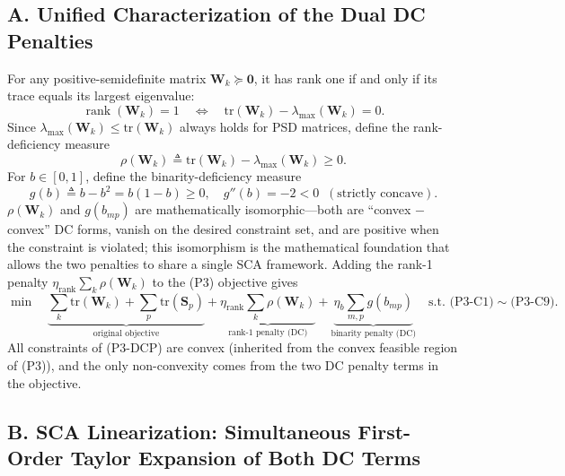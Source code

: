 \documentclass[12pt,a4paper]{article}
\newcommand{\mat}[1]{\mathbf{#1}}
\newcommand{\tr}{\text{tr}}
\DeclareMathOperator{\rank}{rank}
\begin{document}
\subsection*{A. Unified Characterization of the Dual DC Penalties}

For any positive-semidefinite matrix $\mat{W}_k \succeq \mat{0}$, it has rank one if and only if its trace equals its largest eigenvalue:
\begin{equation}\label{eq:rank1-equivalence}
\rank(\mat{W}_k) = 1 \quad \Longleftrightarrow \quad \tr(\mat{W}_k) - \lambda_{\max}(\mat{W}_k) = 0.
\end{equation}
Since $\lambda_{\max}(\mat{W}_k) \leq \tr(\mat{W}_k)$ always holds for PSD matrices, define the rank-deficiency measure
\begin{equation}\label{eq:rho-def}
\rho(\mat{W}_k) \triangleq \tr(\mat{W}_k) - \lambda_{\max}(\mat{W}_k) \geq 0.
\end{equation}
For $b \in [0,1]$, define the binarity-deficiency measure
\begin{equation}\label{eq:g-def}
g(b) \triangleq b - b^2 = b(1-b) \geq 0, \quad g''(b) = -2 < 0 \;\; (\text{strictly concave}).
\end{equation}
$\rho(\mat{W}_k)$ and $g(b_{mp})$ are mathematically isomorphic---both are ``convex $-$ convex'' DC forms, vanish on the desired constraint set, and are positive when the constraint is violated; this isomorphism is the mathematical foundation that allows the two penalties to share a single SCA framework. Adding the rank-1 penalty $\eta_{\text{rank}} \sum_k \rho(\mat{W}_k)$ to the (P3) objective gives
\begin{equation}\label{eq:p3-dcp}
\min \quad \underbrace{\sum_k \tr(\mat{W}_k) + \sum_p \tr(\mat{S}_p)}_{\text{original objective}} + \underbrace{\eta_{\text{rank}} \sum_k \rho(\mat{W}_k)}_{\text{rank-1 penalty (DC)}} + \underbrace{\eta_b \sum_{m,p} g(b_{mp})}_{\text{binarity penalty (DC)}} \quad \text{s.t. (P3-C1)} \sim \text{(P3-C9)}.
\end{equation}
All constraints of (P3-DCP) are convex (inherited from the convex feasible region of (P3)), and the only non-convexity comes from the two DC penalty terms in the objective.

\subsection*{B. SCA Linearization: Simultaneous First-Order Taylor Expansion of Both DC Terms}
\end{document}
